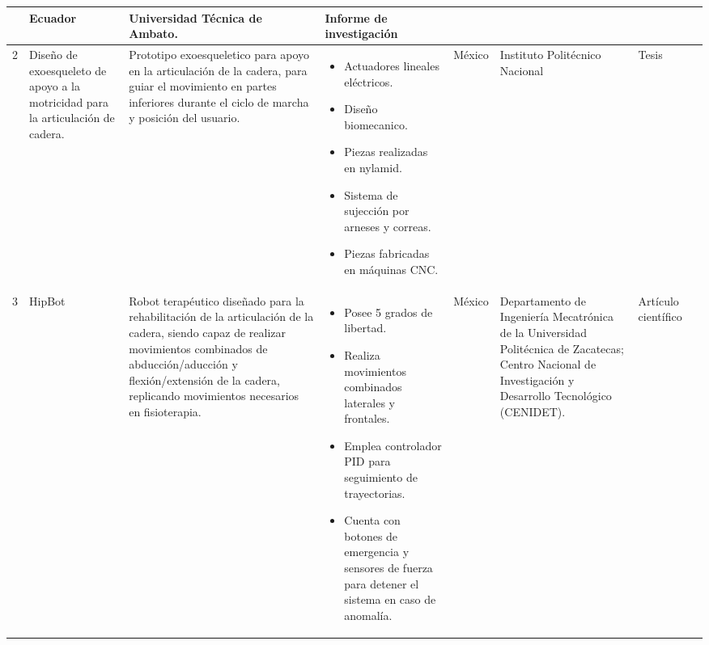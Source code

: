 \begin{table}[h!]
{{\begin{tabular}{|m{0.8cm}|m{2.5cm}|m{5cm}|m{7cm}|m{1.4cm}|m{4cm}|m{2cm}|m{0.5cm}|}
{\begin{itemize}
				\end{itemize}}                                                   & {Ecuador}         & {Universidad   Técnica de Ambato.}                                                                                                                            & {Informe de   investigación} & {\cite{05}}  \\ \hline
				{2} & {Diseño de   exoesqueleto de apoyo a la motricidad para la articulación de cadera.}                                   & {Prototipo exoesqueletico para apoyo en la   articulación de la cadera, para guiar el movimiento en partes inferiores   durante el ciclo de marcha y posición del usuario.}                                                                           & {\begin{itemize}
						\item Actuadores   lineales eléctricos.
						\item Diseño biomecanico.
						\item Piezas realizadas en nylamid.
						\item Sistema de sujección por arneses y correas.
						\item Piezas fabricadas en máquinas CNC.
						
				\end{itemize}}                                                                                                               & {México}          & {Instituto   Politécnico Nacional}                                                                                                                            & {Tesis}                      & {\cite{06}}  \\ \hline
				{3} & {HipBot}                                                                                                              & {Robot terapéutico   diseñado para la rehabilitación de la articulación de la cadera, siendo capaz   de realizar movimientos combinados de abducción/aducción y flexión/extensión   de la cadera, replicando movimientos necesarios en fisioterapia.} & {\begin{itemize}
						\item Posee 5 grados de libertad.
						\item Realiza movimientos combinados laterales y frontales.
						\item Emplea controlador PID para seguimiento de trayectorias.
						\item Cuenta con botones de emergencia y sensores de fuerza para detener el sistema en caso de anomalía.
						
				\end{itemize}}                                                                                                                   & {México}          &{Departamento de   Ingeniería Mecatrónica de la Universidad Politécnica de Zacatecas; Centro   Nacional de Investigación y Desarrollo Tecnológico (CENIDET).} &{Artículo   científico}      & {\cite{07}}  \\ \hline
	\end{tabular}}}
\end{table}
